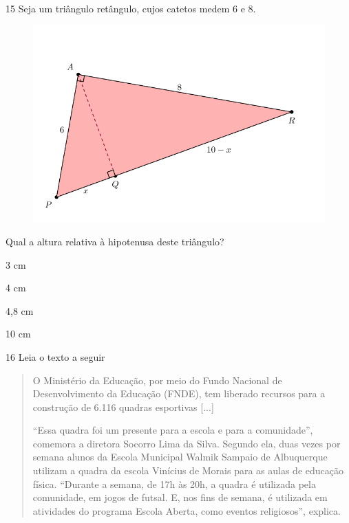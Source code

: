 \pagebreak
\num{15} Seja um triângulo retângulo, cujos catetos medem 6 e 8.

\begin{figure}[htpb!]
\centering
\includegraphics[width=.6\textwidth]{./tikz/042.pdf}
\end{figure}

Qual a altura relativa à hipotenusa deste triângulo?

\begin{escolha}

  \item 3 cm

  \item 4 cm

  \item 4,8 cm

  \item 10 cm

\end{escolha}


\num{16} Leia o texto a seguir

\begin{quote}
O Ministério da Educação, por meio do Fundo Nacional de Desenvolvimento
da Educação (FNDE), tem liberado recursos para a construção de 6.116
quadras esportivas {[}...{]}

``Essa quadra foi um presente para a escola e para a comunidade'',
comemora a diretora Socorro Lima da Silva. Segundo ela, duas vezes por
semana alunos da Escola Municipal Walmik Sampaio de Albuquerque utilizam
a quadra da escola Vinícius de Morais para as aulas de educação física.
``Durante a semana, de 17h às 20h, a quadra é utilizada pela comunidade,
em jogos de futsal. E, nos fins de semana, é utilizada em atividades do
programa Escola Aberta, como eventos religiosos'', explica.

\end{quote}

